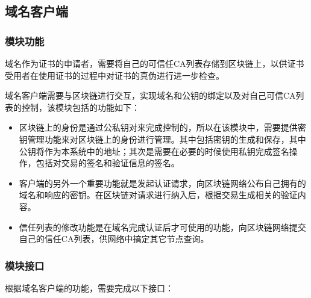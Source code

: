\subsection{域名客户端}

\subsubsection{模块功能}

域名作为证书的申请者，需要将自己的可信任CA列表存储到区块链上，以供证书受用者在使用证书的过程中对证书的真伪进行进一步检查。

域名客户端需要与区块链进行交互，实现域名和公钥的绑定以及对自己可信CA列表的控制，该模块包括的功能如下：

\begin{itemize}
	\item 
	\noindent{}

	区块链上的身份是通过公私钥对来完成控制的，所以在该模块中，需要提供密钥管理功能来对区块链上的身份进行管理。其中包括密钥的生成和保存，其中公钥将作为本系统中的地址；其次是需要在必要的时候使用私钥完成签名操作，包括对交易的签名和验证信息的签名。

	\item 
	\noindent{}

	客户端的另外一个重要功能就是发起认证请求，向区块链网络公布自己拥有的域名和响应的密钥。在区块链对请求进行纳入后，根据交易生成相关的验证内容。

	\item
	\noindent{}

	信任列表的修改功能是在域名完成认证后才可使用的功能，向区块链网络提交自己的信任CA列表，供网络中搞定其它节点查询。

\end{itemize}

\subsubsection{模块接口}

根据域名客户端的功能，需要完成以下接口：

